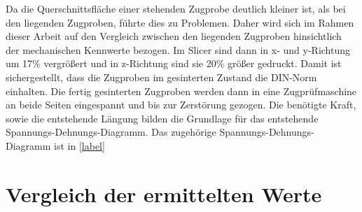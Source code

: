 Da die Querschnittsfläche einer stehenden Zugprobe deutlich kleiner ist, als bei den liegenden Zugproben, führte dies zu Problemen. Daher wird sich im Rahmen dieser Arbeit auf den Vergleich zwischen den liegenden Zugproben hinsichtlich der mechanischen Kennwerte bezogen.
Im Slicer sind dann in x- und y-Richtung um 17\% vergrößert und in z-Richtung sind sie 20\% größer gedruckt. Damit ist sichergestellt, dass die Zugproben im gesinterten Zustand die DIN-Norm einhalten. Die fertig gesinterten Zugproben werden dann in eine Zugprüfmaschine an beide Seiten eingespannt und bis zur Zerstörung gezogen. Die benötigte Kraft, sowie die entstehende Längung bilden die Grundlage für das entstehende Spannungs-Dehnungs-Diagramm.
Das zugehörige Spannungs-Dehnungs-Diagramm ist in \autoref{label}

\section{Vergleich der ermittelten Werte}

